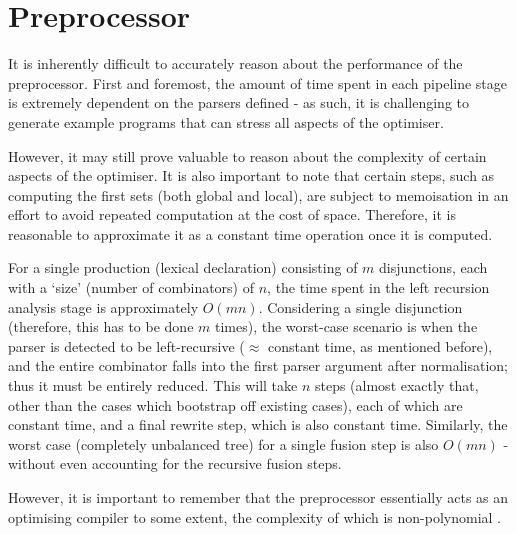 \section{Preprocessor}
\label{sec:eva_preproc}

It is inherently difficult to accurately reason about the performance of the preprocessor.
First and foremost, the amount of time spent in each pipeline stage is extremely dependent on the parsers defined - as such, it is challenging to generate example programs that can stress all aspects of the optimiser.

However, it may still prove valuable to reason about the complexity of certain aspects of the optimiser.
It is also important to note that certain steps, such as computing the first sets (both global and local), are subject to memoisation in an effort to avoid repeated computation at the cost of space.
Therefore, it is reasonable to approximate it as a constant time operation once it is computed.

For a single production (lexical declaration) consisting of $m$ disjunctions, each with a `size' (number of combinators) of $n$, the time spent in the left recursion analysis stage is approximately $O(mn)$.
Considering a single disjunction (therefore, this has to be done $m$ times), the worst-case scenario is when the parser is detected to be left-recursive ($\approx$ constant time, as mentioned before), and the entire combinator falls into the first parser argument after normalisation; thus it must be entirely reduced.
This will take $n$ steps (almost exactly that, other than the cases which bootstrap off existing cases), each of which are constant time, and a final rewrite step, which is also constant time.
Similarly, the worst case (completely unbalanced tree) for a single fusion step is also $O(mn)$ - without even accounting for the recursive fusion steps.

However, it is important to remember that the preprocessor essentially acts as an optimising compiler to some extent, the complexity of which is non-polynomial \cite{goss13}.